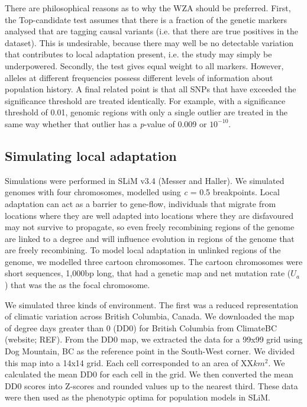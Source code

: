 \documentclass[11pt,twoside,lineno]{GSA_format}
\begin{document}
There are philosophical reasons as to why the WZA should be preferred. First, the Top-candidate test assumes that there is a fraction of the genetic markers analysed that are tagging causal variants (i.e. that there are true positives in the dataset). This is undesirable, because there may well be no detectable variation that contributes to local adaptation present, i.e. the study may simply be underpowered. Secondly, the test gives equal weight to all markers. However, alleles at different frequencies possess different levels of information about population history. A final related point is that all SNPs that have exceeded the significance threshold are treated identically. For example, with a significance threshold of 0.01, genomic regions with only a single outlier are treated in the same way whether that outlier has a \textit{p}-value of 0.009 or $10^{-10}$.

\subsection{Simulating local adaptation} 

Simulations were performed in SLiM v3.4 (Messer and Haller). 
We simulated genomes with four chromosomes, modelled using \textit{c} = 0.5 breakpoints. 
Local adaptation can act as a barrier to gene-flow, individuals that migrate from locations where they are well adapted into locations where they are disfavoured may not survive to propagate, so even freely recombining regions of the genome are linked to a degree and will influence evolution in regions of the genome that are freely recombining. To model local adaptation in unlinked regions of the genome, we modelled three cartoon chromosomes. The cartoon chromosomes were short sequences, 1,000bp long, that had a genetic map and net mutation rate (\textit{$U_a$}) that was the as the focal chromosome. 

We simulated three kinds of environment. The first was a reduced representation of climatic variation across British Columbia, Canada. We downloaded the map of degree days greater than 0 (DD0) for British Columbia from ClimateBC (website; REF). From the DD0 map, we extracted the data for a 99x99 grid using Dog Mountain, BC as the reference point in the South-West corner. We divided this map into a 14x14 grid. Each cell corresponded to an area of XX$km^2$. We calculated the mean DD0 for each cell in the grid. We then converted the mean DD0 scores into Z-scores and rounded values up to the nearest third. These data were then used as the phenotypic optima for population models in SLiM.
\end{document}
